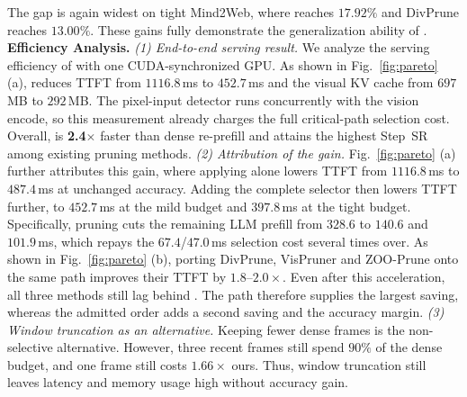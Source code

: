 %
The gap is again widest on tight Mind2Web, where \method{} reaches $17.92\%$ and DivPrune reaches $13.00\%$.
%
These gains fully demonstrate the generalization ability of \method{}.
\\
\noindent\textbf{Efficiency Analysis.}
\noindent\textit{(1) End-to-end serving result.}
We analyze the serving efficiency of \method{} with one CUDA-synchronized GPU.
%
As shown in Fig.~\ref{fig:pareto} (a), \method{} reduces TTFT from $1116.8$\,ms to $452.7$\,ms and the visual KV cache from $697$\,MB to $292$\,MB.
%
The pixel-input detector runs concurrently with the vision encode, so this measurement already charges the full critical-path selection cost.
%
Overall, \method{} is \textbf{2.4$\times$} faster than dense re-prefill and attains the highest Step~SR among existing pruning methods.
%
\noindent\textit{(2) Attribution of the gain.}
Fig.~\ref{fig:pareto} (a) further attributes this gain, where applying \kvr{} alone lowers TTFT from $1116.8$\,ms to $487.4$\,ms at unchanged accuracy.
%
Adding the complete selector then lowers TTFT further, to $452.7$\,ms at the mild budget and $397.8$\,ms at the tight budget.
%
Specifically, pruning cuts the remaining LLM prefill from $328.6$ to $140.6$ and $101.9$\,ms, which repays the $67.4$/$47.0$\,ms selection cost several times over.
%
As shown in Fig.~\ref{fig:pareto} (b), porting DivPrune, VisPruner and ZOO-Prune onto the same \kvr{} path improves their TTFT by $1.8$--$2.0\times$.
%
Even after this acceleration, all three methods still lag behind \method{}.
%
The \kvr{} path therefore supplies the largest saving, whereas the admitted order adds a second saving and the accuracy margin.
%
\noindent\textit{(3) Window truncation as an alternative.}
Keeping fewer dense frames is the non-selective alternative.
%
However, three recent frames still spend $90\%$ of the dense budget, and one frame still costs $1.66\times$ ours.
%
Thus, window truncation still leaves latency and memory usage high without accuracy gain.
